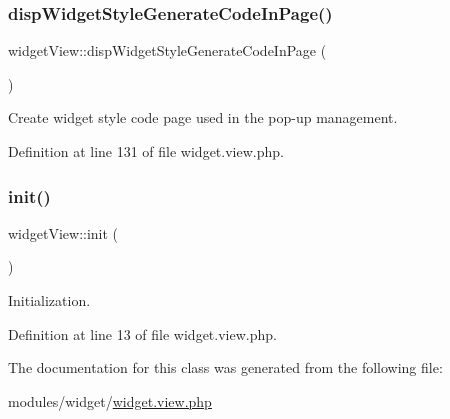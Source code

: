 \subsubsection{\texorpdfstring{disp\+Widget\+Style\+Generate\+Code\+In\+Page()}{dispWidgetStyleGenerateCodeInPage()}}
{\footnotesize\ttfamily widget\+View\+::disp\+Widget\+Style\+Generate\+Code\+In\+Page (\begin{DoxyParamCaption}{ }\end{DoxyParamCaption})}



Create widget style code page used in the pop-\/up management. 



Definition at line 131 of file widget.\+view.\+php.

\hypertarget{classwidgetView_aae33eb1e6769bef674ec184703a6bac2}{}\label{classwidgetView_aae33eb1e6769bef674ec184703a6bac2} 
\subsubsection{\texorpdfstring{init()}{init()}}
{\footnotesize\ttfamily widget\+View\+::init (\begin{DoxyParamCaption}{ }\end{DoxyParamCaption})}



Initialization. 



Definition at line 13 of file widget.\+view.\+php.



The documentation for this class was generated from the following file\+:\begin{DoxyCompactItemize}
\item 
modules/widget/\hyperlink{widget_8view_8php}{widget.\+view.\+php}\end{DoxyCompactItemize}
